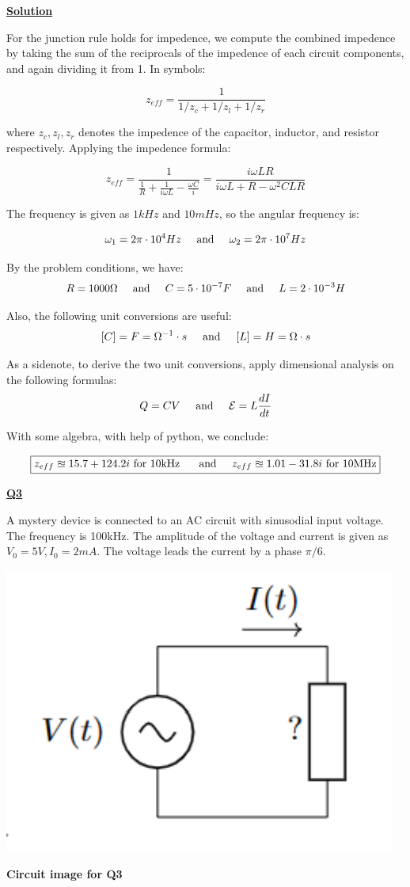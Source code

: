 \documentclass{article}
\newcommand{\new}[1]{
    \vspace{2mm}
    \noindent
    \textbf{
    \underline{#1}}
}
\newcommand{\textAnd}{
    {
        \hspace{5mm}
        \textrm{and}
        \hspace{5mm}
    }
}
\def\Ohm{{\Omega}}
\begin{document}
\new{Solution}
For the junction rule holds for impedence, we compute the combined 
impedence by taking the sum of the reciprocals of the impedence 
of each circuit components, and again dividing it from 1. 
In symbols:

\[
    z_{eff} = 
    \frac{1}
    {1/z_c+1/z_l+1/z_r}
\]

where $z_c, z_l, z_r$ denotes the impedence of 
the capacitor, inductor, and resistor respectively. 
Applying the impedence formula:

\[
    z_{eff} = \frac{1}
    {
        \frac{1}{R}
        +
        \frac{1}{i\omega L}
        -
        \frac{\omega C}{i}
    }
    =
    \frac{i \omega LR}
    {i\omega L + R - \omega^2CLR}
\]

The frequency is given as $1kHz$ and $10mHz$, so the angular frequency is:

\[
    \omega_1 = 2\pi \cdot 10^4 Hz
    \textAnd
    \omega_2 = 2\pi \cdot 10^7 Hz
\]

By the problem conditions, we have:
\[
    R = 1000 \Omega
    \textAnd
    C = 5\cdot 10^{-7} F 
    \textAnd
    L = 2\cdot 10^{-3} H
\]

Also, the following unit conversions are useful:
\[
    [C] = F = \Ohm^{-1} \cdot s
    \textAnd
    [L] = H = \Ohm \cdot s
\]

As a sidenote, to derive the two unit conversions, apply dimensional 
analysis on the following formulas:
\[
    Q = CV
    \textAnd
    \mathcal{E} = L\frac{dI}{dt}
\]

With some algebra, with help of python, we conclude:

\[
    \boxed{
    z_{eff} \approxeq 15.7 + 124.2i 
    \textrm{  for 10kHz
    }
    \textAnd
    z_{eff} \approxeq 1.01 -31.8i 
    \textrm{  for 10MHz}
    }
\]

\newpage

\new{Q3}
A mystery device is connected to an AC circuit with 
sinusodial input voltage. The frequency is 100kHz. 
The amplitude of the voltage and current is given as 
$V_0 = 5V, I_0 = 2mA$. The voltage leads the current 
by a phase $\pi/6$. 

\begin{center}
\includegraphics[width = .5\linewidth]{Q3_setup.png}

\textbf{
Circuit image for Q3
}
\end{center}
\end{document}
